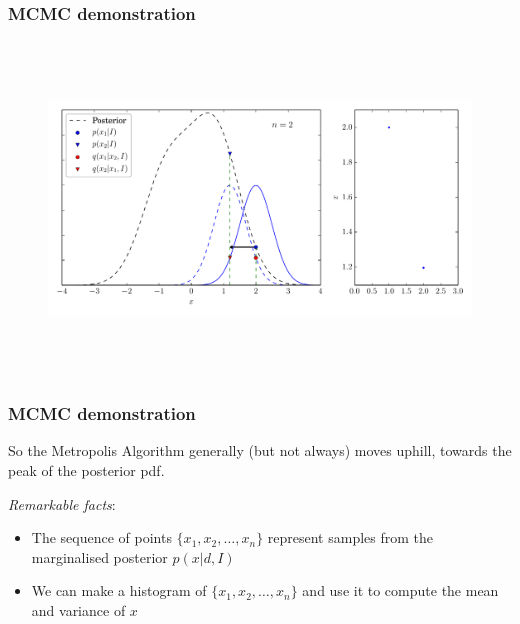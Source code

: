 \begin{frame}

\frametitle{MCMC demonstration}
\label{mcmcdemonstration}

\begin{figure}[htbp]
\centering
\includegraphics[keepaspectratio,width=\textwidth,height=250pt]{figures/mcmc_example_1.pdf}
\label{mcmc_example_1}
\end{figure}

\end{frame}

\begin{frame}

\frametitle{MCMC demonstration}
\label{mcmcdemonstration}

So the Metropolis Algorithm generally (but not always) moves uphill, towards the peak
of the posterior pdf.

\emph{Remarkable facts}:

\begin{itemize}
\item The sequence of points $\{x_1, x_2, \ldots, x_n\}$ represent samples from the marginalised
posterior $p(x|d,I)$

\item We can make a histogram of $\{x_1, x_2, \ldots, x_n\}$ and use it to compute the mean and variance
of $x$

\end{itemize}

\end{frame}

